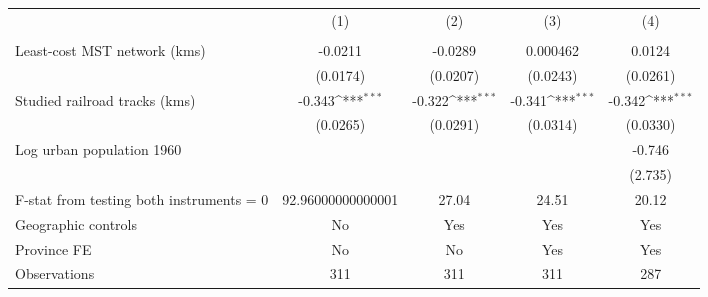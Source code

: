 {
\def\sym#1{\ifmmode^{#1}\else\(^{#1}\)\fi}
\begin{tabular}{l*{4}{c}}
\hline\hline
                &\multicolumn{1}{c}{(1)}&\multicolumn{1}{c}{(2)}&\multicolumn{1}{c}{(3)}&\multicolumn{1}{c}{(4)}\\
                &\multicolumn{1}{c}{}&\multicolumn{1}{c}{}&\multicolumn{1}{c}{}&\multicolumn{1}{c}{}\\
\hline
Least-cost MST network (kms)&  -0.0211         &  -0.0289         & 0.000462         &   0.0124         \\
                & (0.0174)         & (0.0207)         & (0.0243)         & (0.0261)         \\
[1em]
Studied railroad tracks (kms)&   -0.343\sym{***}&   -0.322\sym{***}&   -0.341\sym{***}&   -0.342\sym{***}\\
                & (0.0265)         & (0.0291)         & (0.0314)         & (0.0330)         \\
[1em]
Log urban population 1960&                  &                  &                  &   -0.746         \\
                &                  &                  &                  &  (2.735)         \\
\hline
F-stat from testing both instruments = 0&92.96000000000001         &    27.04         &    24.51         &    20.12         \\
Geographic controls&       No         &      Yes         &      Yes         &      Yes         \\
Province FE     &       No         &       No         &      Yes         &      Yes         \\
Observations    &      311         &      311         &      311         &      287         \\
\hline\hline
\end{tabular}
}
